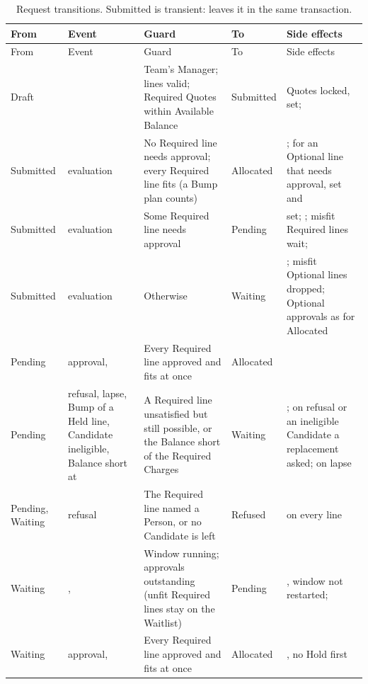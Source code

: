 {\footnotesize\setlength{\tabcolsep}{3pt}
\begin{longtable}{@{}L{0.09\textwidth}L{0.18\textwidth}L{0.30\textwidth}L{0.09\textwidth}L{0.30\textwidth}@{}}
\caption{Request transitions. Submitted is transient:  leaves it in the same transaction.}\label{tab:requests-transitions}\\
\toprule
From & Event & Guard & To & Side effects \\
\midrule
\endfirsthead
\toprule
From & Event & Guard & To & Side effects \\
\midrule
\endhead
\bottomrule
\endlastfoot
Draft &  & Team's Manager; lines valid; Required Quotes within Available Balance & Submitted & Quotes locked,  set;  \\
Submitted & evaluation & No Required line needs approval; every Required line fits (a Bump plan counts) & Allocated & ; for an Optional line that needs approval,  set and  \\
Submitted & evaluation & Some Required line needs approval & Pending &  set; ; misfit Required lines wait;  \\
Submitted & evaluation & Otherwise & Waiting & ; misfit Optional lines dropped; Optional approvals as for Allocated \\
Pending & approval,  & Every Required line approved and fits at once & Allocated &  \\
Pending & refusal, lapse, Bump of a Held line, Candidate ineligible, Balance short at  & A Required line unsatisfied but still possible, or the Balance short of the Required Charges & Waiting & ; on refusal or an ineligible Candidate a replacement asked; on lapse  \\
Pending, Waiting & refusal & The Required line named a Person, or no Candidate is left & Refused &  on every line \\
Waiting & ,  & Window running; approvals outstanding (unfit Required lines stay on the Waitlist) & Pending & , window not restarted;  \\
Waiting & approval,  & Every Required line approved and fits at once & Allocated & , no Hold first \\

\end{longtable}}
